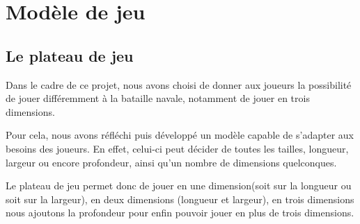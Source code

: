 \section{Modèle de jeu}


\subsection{Le plateau de jeu}

	Dans le cadre de ce projet, nous avons choisi de donner aux joueurs la possibilité de jouer différemment à la bataille navale, notamment de jouer en trois dimensions.\newline
	
	Pour cela, nous avons réfléchi puis développé un modèle capable de s'adapter aux besoins des joueurs. En effet, celui-ci peut décider de toutes les tailles, longueur, largeur ou encore profondeur, ainsi qu'un nombre de dimensions quelconques. \newline
	
	Le plateau de jeu permet donc de jouer en une dimension(soit sur la longueur ou soit sur la largeur), en deux dimensions (longueur et largeur), en trois dimensions nous ajoutons la profondeur pour enfin pouvoir jouer en plus de trois dimensions.


